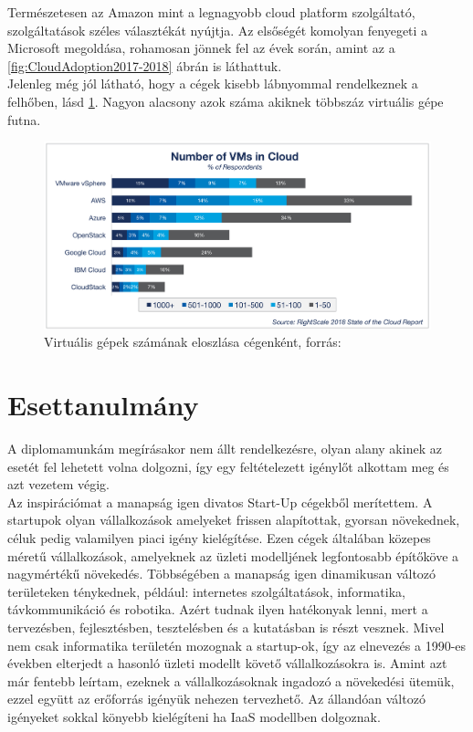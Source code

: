 \documentclass[12pt,oneside,justify,table]{book}
\begin{document}
Természetesen az Amazon mint a legnagyobb cloud platform szolgáltató, szolgáltatások széles választékát nyújtja. Az elsőségét komolyan fenyegeti a Microsoft megoldása, rohamosan jönnek fel az évek során, amint az a \ref{fig:CloudAdoption2017-2018} ábrán is láthattuk.  \\

Jelenleg még jól látható, hogy a cégek kisebb lábnyommal rendelkeznek a felhőben, lásd \ref{fig:VMsPerCompany}. Nagyon alacsony azok száma akiknek többszáz virtuális gépe futna. 
\begin{figure}[H]
\centering
\includegraphics[width=1\textwidth]{26-Cloud-Computing-Trends-Number-of-VMs.png}
\caption{Virtuális gépek számának eloszlása cégenként, forrás: \cite{RightScale}}
\label{fig:VMsPerCompany}
\end{figure}

\chapter{Esettanulmány}

A diplomamunkám megírásakor nem állt rendelkezésre, olyan alany akinek az esetét fel lehetett volna dolgozni, így egy feltételezett igénylőt alkottam meg és azt vezetem végig. \\

Az inspirációmat a manapság igen divatos Start-Up cégekből merítettem. A startupok olyan vállalkozások amelyeket frissen alapítottak, gyorsan növekednek, céluk pedig valamilyen piaci igény kielégítése. Ezen cégek általában közepes méretű vállalkozások, amelyeknek az üzleti modelljének legfontosabb építőköve a nagymértékű növekedés. Többségében a manapság igen dinamikusan változó területeken ténykednek, például: internetes szolgáltatások, informatika, távkommunikáció és robotika. Azért tudnak ilyen hatékonyak lenni, mert a tervezésben, fejlesztésben, tesztelésben és a kutatásban is részt vesznek. Mivel nem csak informatika területén mozognak a startup-ok, így az elnevezés a 1990-es években elterjedt a hasonló üzleti modellt követő vállalkozásokra is.
Amint azt már fentebb leírtam, ezeknek a vállalkozásoknak ingadozó a növekedési ütemük, ezzel együtt az erőforrás igényük nehezen tervezhető.  Az állandóan változó igényeket sokkal könyebb kielégíteni ha IaaS modellben dolgoznak.\\
\end{document}
